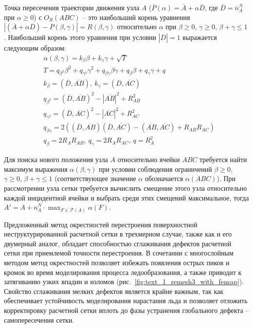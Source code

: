 \documentclass[a4paper,14pt]{extarticle}                     %
\theoremstyle{plain}                                         %
\begin{document}
Точка пересечения траектории движения узла $A$ ($\overline{P}(\alpha) = \overline{A} + \alpha \overline{D}$, где $\overline{D} = \overline{n}_A^N$ при $\alpha \ge 0$) с $O_R(ABC)$ -- это наибольший корень уравнения $|(\overline{A} + \alpha \overline{D}) - \overline{P}(\beta, \gamma)| = R(\beta, \gamma)$ относительно $\alpha$ при $\beta \ge 0$, $\gamma \ge 0$, $\beta + \gamma \le 1$.
Наибольший корень этого уравнения при условии $|\overline{D}| = 1$ выражается следующим образом:
\begin{equation*}
	\begin{aligned}
		& \alpha(\beta, \gamma) = k_{\beta} \beta + k_{\gamma} \gamma + \sqrt{T} \\
		& T = q_{\beta^2} \beta^2 + q_{\gamma^2} \gamma^2 + q_{\beta \gamma} \beta \gamma + q_{\beta} \beta + q_{\gamma} \gamma + q \\
		& k_{\beta} = (\overline{D}, \overline{AB}), \ k_{\gamma} = (\overline{D}, \overline{AC}) \\
		& q_{\beta^2} = (\overline{D}, \overline{AB})^2 - |\overline{AB}|^2 + R_{AB}^2 \\
		& q_{\gamma^2} = (\overline{D}, \overline{AC})^2 - |\overline{AC}|^2 + R_{AC}^2 \\
		& q_{\beta \gamma} = 2 \left( (\overline{D}, \overline{AB}) (\overline{D}, \overline{AC}) - (\overline{AB}, \overline{AC}) + R_{AB}R_{AC} \right) \\
		& q_{\beta} = 2 R_A R_{AB}, \ q_{\gamma} = 2 R_A R_{AC}, \ q = R_A^2
	\end{aligned}
\end{equation*}

Для поиска нового положения узла $A$ относительно ячейки $ABC$ требуется найти максимум выражения $\alpha(\beta, \gamma)$ при условии соблюдения ограничений $\beta \ge 0$, $\gamma \ge 0$, $\beta + \gamma \le 1$ (соответствующее значение $\alpha$ обозначается $\alpha(ABC)$).
При рассмотрении узла сетки требуется вычислить смещение этого узла относительно каждой инцидентной ячейки и выбрать среди этих смещений максимальное, тогда $\overline{A}' = \overline{A} + \overline{n}_A^N \cdot \max_{F \in \mathscr{F}(A)}{\alpha(F)}$.

Предложенный метод окрестностей перестроения поверхностной неструктурированной расчетной сетки в трехмерном случае, также как и его двумерный аналог, обладает способностью сглаживания дефектов расчетной сетки при приемлемой точности перестроения.
В сочетании с многослойным методом метод окрестностей позволяет избежать появления острых пиков и кромок во время моделирования процесса ледообразования, а также приводит к затягиванию узких впадин и изломов (рис.~\ref{fig:text_1_remesh3_with_fensap}).
Свойство сглаживания мелких дефектов является крайне важным, так как обеспечивает устойчивость моделирования нарастания льда и позволяет отложить корректировку расчетной сетки вплоть до фазы устранения глобального дефекта -- самопересечения сетки.
\end{document}
